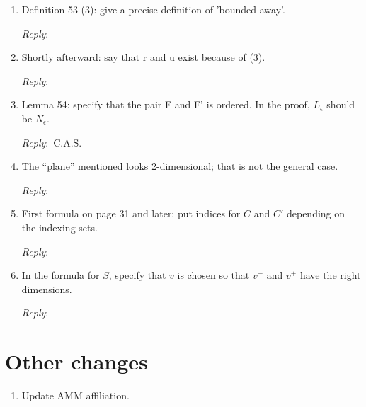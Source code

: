 \documentclass{amsart}
\newcommand{\ar}{\medskip\noindent\textit{Reply}:\ }
\newcommand{\tbw}{\ar \hrulefill}
\newcommand{\cas}{\ar C.A.S.}
\begin{document}
\begin{enumerate}
		\item Definition 53 (3): give a precise definition of 'bounded away'.

		\tbw

		\item Shortly afterward: say that r and u exist because of (3).

		\tbw

		\item Lemma 54: specify that the pair F and F' is ordered. In the proof, $L_\epsilon$ should be $N_\epsilon$.

		\cas

		\item The “plane” mentioned looks 2-dimensional; that is not the general case.

		\tbw

		\item First formula on page 31 and later: put indices for $C$ and $C'$ depending on the indexing sets.

		\tbw

		\item In the formula for $S$, specify that $v$ is chosen so that $v^-$ and $v^+$ have the right dimensions.

		\tbw
	\end{enumerate}

	\section{Other changes}

	\begin{enumerate}
		\item Update AMM affiliation.

	\end{enumerate}
\end{document}
